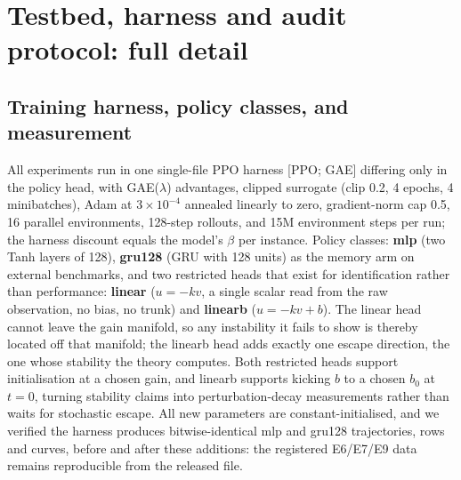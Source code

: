 \section{Testbed, harness and audit protocol: full detail}
\label{app:testbed}

\subsection{Training harness, policy classes, and measurement}

All experiments run in one single-file PPO harness {[}PPO; GAE{]}
differing only in the policy head, with GAE(\(\lambda\)) advantages,
clipped surrogate (clip 0.2, 4 epochs, 4 minibatches), Adam at
\(3 \times 10^{-4}\) annealed linearly to zero, gradient-norm cap 0.5,
16 parallel environments, 128-step rollouts, and 15M environment steps
per run; the harness discount equals the model's \(\beta\) per instance.
Policy classes: \textbf{mlp} (two Tanh layers of 128), \textbf{gru128}
(GRU with 128 units) as the memory arm on external benchmarks, and two
restricted heads that exist for identification rather than performance:
\textbf{linear} (\(u = -kv\), a single scalar read from the raw
observation, no bias, no trunk) and \textbf{linearb} (\(u = -kv + b\)).
The linear head cannot leave the gain manifold, so any instability it
fails to show is thereby located off that manifold; the linearb head
adds exactly one escape direction, the one whose stability the theory
computes. Both restricted heads support initialisation at a chosen gain,
and linearb supports kicking \(b\) to a chosen \(b_0\) at \(t=0\),
turning stability claims into perturbation-decay measurements rather
than waits for stochastic escape. All new parameters are
constant-initialised, and we verified the harness produces
bitwise-identical mlp and gru128 trajectories, rows and curves, before
and after these additions: the registered E6/E7/E9 data remains
reproducible from the released file.

